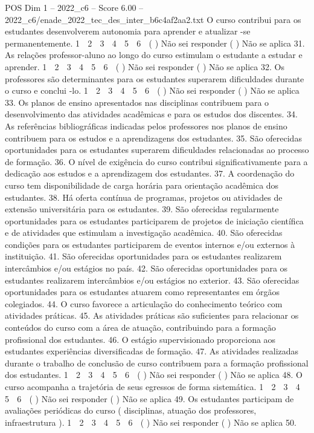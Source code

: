 \begin{textsample}{POS Dim 1 – 2022\_c6 – Score 6.00 – 2022\_c6/enade\_2022\_tec\_des\_inter\_b6c4af2aa2.txt}
O curso contribui para os estudantes desenvolverem autonomia para aprender e atualizar -se permanentemente. 1 ⃝ 2 ⃝ 3 ⃝ 4 ⃝ 5 ⃝ 6 ⃝ ( ) Não sei responder ( ) Não se aplica 31.
As relações professor-aluno ao longo do curso estimulam o estudante a estudar e aprender. 1 ⃝ 2 ⃝ 3 ⃝ 4 ⃝ 5 ⃝ 6 ⃝ ( ) Não sei responder ( ) Não se aplica 32.
Os professores são determinantes para os estudantes superarem dificuldades durante o curso e conclui -lo. 1 ⃝ 2 ⃝ 3 ⃝ 4 ⃝ 5 ⃝ 6 ⃝ ( ) Não sei responder ( ) Não se aplica 33.
Os planos de ensino apresentados nas disciplinas contribuem para o desenvolvimento das atividades acadêmicas e para os estudos dos discentes. 34.
As referências bibliográficas indicadas pelos professores nos planos de ensino contribuem para os estudos e a aprendizagens dos estudantes. 35.
São oferecidas oportunidades para os estudantes superarem dificuldades relacionadas ao processo de formação. 36.
O nível de exigência do curso contribui significativamente para a dedicação aos estudos e a aprendizagem dos estudantes. 37.
A coordenação do curso tem disponibilidade de carga horária para orientação acadêmica dos estudantes. 38.
Há oferta contínua de programas, projetos ou atividades de extensão universitária para os estudantes. 39.
São oferecidas regularmente oportunidades para os estudantes participarem de projetos de iniciação científica e de atividades que estimulam a investigação acadêmica. 40.
São oferecidas condições para os estudantes participarem de eventos internos e/ou externos à instituição. 41.
São oferecidas oportunidades para os estudantes realizarem intercâmbios e/ou estágios no país. 42.
São oferecidas oportunidades para os estudantes realizarem intercâmbios e/ou estágios no exterior. 43.
São oferecidas oportunidades para os estudantes atuarem como representantes em órgãos colegiados. 44.
O curso favorece a articulação do conhecimento teórico com atividades práticas. 45.
As atividades práticas são suficientes para relacionar os conteúdos do curso com a área de atuação, contribuindo para a formação profissional dos estudantes. 46.
O estágio supervisionado proporciona aos estudantes experiências diversificadas de formação. 47.
As atividades realizadas durante o trabalho de conclusão de curso contribuem para a formação profissional dos estudantes. 1 ⃝ 2 ⃝ 3 ⃝ 4 ⃝ 5 ⃝ 6 ⃝ ( ) Não sei responder ( ) Não se aplica 48.
O curso acompanha a trajetória de seus egressos de forma sistemática. 1 ⃝ 2 ⃝ 3 ⃝ 4 ⃝ 5 ⃝ 6 ⃝ ( ) Não sei responder ( ) Não se aplica 49.
Os estudantes participam de avaliações periódicas do curso ( disciplinas, atuação dos professores, infraestrutura ). 1 ⃝ 2 ⃝ 3 ⃝ 4 ⃝ 5 ⃝ 6 ⃝ ( ) Não sei responder ( ) Não se aplica 50.

\end{textsample}
